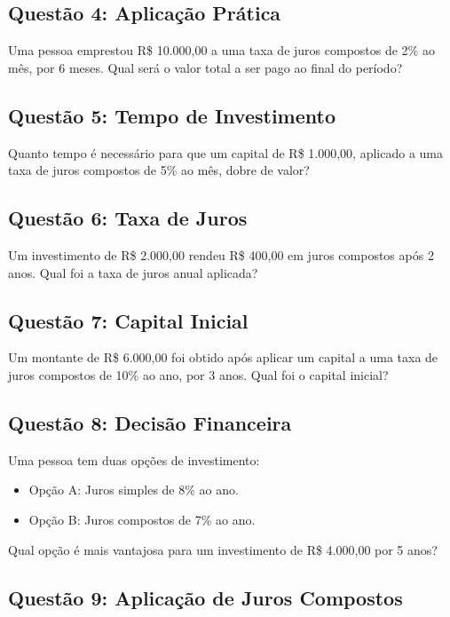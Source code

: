 \documentclass[11pt]{article}
\begin{document}
\begin{multicols}{2}
\subsection*{Questão 4: Aplicação Prática}

Uma pessoa emprestou R\$ 10.000,00 a uma taxa de juros compostos de 2\% ao mês, por 6 meses. Qual será o valor total a ser pago ao final do período?

\subsection*{Questão 5: Tempo de Investimento}

Quanto tempo é necessário para que um capital de R\$ 1.000,00, aplicado a uma taxa de juros compostos de 5\% ao mês, dobre de valor?

\subsection*{Questão 6: Taxa de Juros}

Um investimento de R\$ 2.000,00 rendeu R\$ 400,00 em juros compostos após 2 anos. Qual foi a taxa de juros anual aplicada?

\subsection*{Questão 7: Capital Inicial}

Um montante de R\$ 6.000,00 foi obtido após aplicar um capital a uma taxa de juros compostos de 10\% ao ano, por 3 anos. Qual foi o capital inicial?

\subsection*{Questão 8: Decisão Financeira}

Uma pessoa tem duas opções de investimento:
\begin{itemize}
    \item Opção A: Juros simples de 8\% ao ano.
    \item Opção B: Juros compostos de 7\% ao ano.
\end{itemize}

Qual opção é mais vantajosa para um investimento de R\$ 4.000,00 por 5 anos?

\subsection*{Questão 9: Aplicação de Juros Compostos}


\end{multicols}
\end{document}
